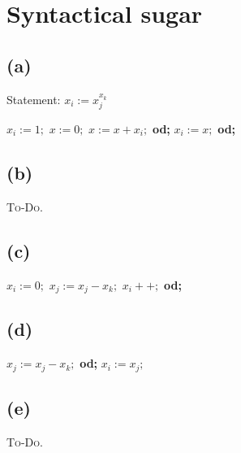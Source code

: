 

\usepackage{algorithm}
\usepackage[noend]{algpseudocode}

\setcounter{section}{1}

\section{Syntactical sugar}

\subsection{(a)}

Statement: \( x_i := x_j^{x_k} \)

\begin{algorithmic}[1]
\State \( x_i := 1; \)
    \State \( x := 0; \)
        \State \( x := x + x_i; \)
    \EndFor \textbf{od;}
    \State \( x_i := x; \)
\EndFor \textbf{od;}
\end{algorithmic}


\subsection{(b)}

\textsc{To-Do.}

\subsection{(c)}

\begin{algorithmic}[1]
\State \( x_i := 0; \)
    \State \( x_j := x_j - x_k; \)
    \State \( x_i++; \)
\EndWhile \textbf{od;}
\end{algorithmic}
\subsection{(d)}

\begin{algorithmic}[1]
    \State \( x_j := x_j - x_k; \)
\EndWhile \textbf{od;}
\State \( x_i := x_j; \)
\end{algorithmic}

\subsection{(e)}

\textsc{To-Do.}


